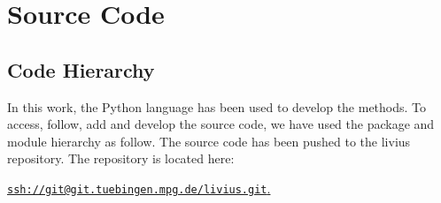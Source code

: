 \documentclass[[12pt,DIV14,BCOR12mm,a4paper,footexclude,headinclude,halfparskip-,twoside,openright,cleardoubleempty,idxtotoc,bibtotoc]{article}
\begin{document}
\section{Source Code}

\subsection{Code Hierarchy}

In this work, the Python language has been used to develop the methods. To access, follow, add and develop the source code, we have used the package and module hierarchy as follow. The source code has been pushed to the livius repository. The repository is located here:

\underline{\texttt{ssh://git@git.tuebingen.mpg.de/livius.git}.}


\vspace{1cm}



\vspace{1cm}
\end{document}
